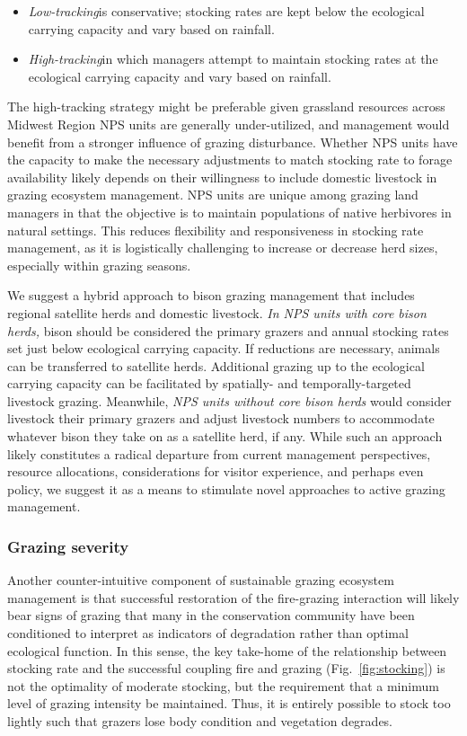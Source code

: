 \begin{itemize}
	\item \emph{Low-tracking}\textemdash is conservative; stocking rates are kept below the ecological carrying capacity and vary based on rainfall.
	\item \emph{High-tracking}\textemdash in which managers attempt to maintain stocking rates at the ecological carrying capacity and vary based on rainfall.
\end{itemize}

The high-tracking strategy might be preferable given grassland resources across Midwest Region NPS units are generally under-utilized, and management would benefit from a stronger influence of grazing disturbance. 
Whether NPS units have the capacity to make the necessary adjustments to match stocking rate to forage availability likely depends on their willingness to include domestic livestock in grazing ecosystem management. 
NPS units are unique among grazing land managers in that the objective is to maintain populations of native herbivores in natural settings. 
This reduces flexibility and responsiveness in stocking rate management, as it is logistically challenging to increase or decrease herd sizes, especially within grazing seasons. 

We suggest a hybrid approach to bison grazing management that includes regional satellite herds and domestic livestock. 
\emph{In NPS units with core bison herds,} bison should be considered the primary grazers and annual stocking rates set just below ecological carrying capacity. 
If reductions are necessary, animals can be transferred to satellite herds. 
Additional grazing up to the ecological carrying capacity can be facilitated by spatially- and temporally-targeted livestock grazing. 
Meanwhile, \emph{NPS units without core bison herds} would consider livestock their primary grazers and adjust livestock numbers to accommodate whatever bison they take on as a satellite herd, if any. 
While such an approach likely constitutes a radical departure from current management perspectives, resource allocations, considerations for visitor experience, and perhaps even policy, we suggest it as a means to stimulate novel approaches to active grazing management. 
 

\subsubsection{Grazing severity} 

Another counter-intuitive component of sustainable grazing ecosystem management is that successful restoration of the fire-grazing interaction will likely bear signs of grazing that many in the conservation community have been conditioned to interpret as indicators of degradation rather than optimal ecological function. 
In this sense, the key take-home of the relationship between stocking rate and the successful coupling fire and grazing (Fig.~\ref{fig:stocking}) is not the optimality of moderate stocking, but the requirement that a minimum level of grazing intensity be maintained.
Thus, it is entirely possible to stock too lightly such that grazers lose body condition and vegetation degrades.

